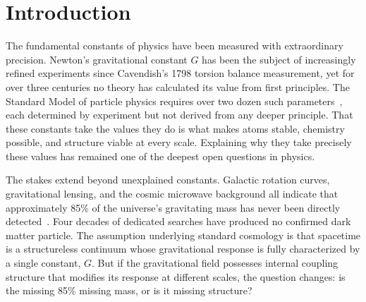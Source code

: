 \documentclass[aps,prd,preprint,superscriptaddress,showpacs,preprintnumbers,amsmath,amssymb,nofootinbib]{revtex4-2}
\begin{document}


\maketitle

\section{Introduction}
\label{sec:intro}

The fundamental constants of physics have been measured with extraordinary precision. Newton's gravitational constant $G$ has been the subject of increasingly refined experiments since Cavendish's 1798 torsion balance measurement, yet for over three centuries no theory has calculated its value from first principles. The Standard Model of particle physics requires over two dozen such parameters~\cite{pdg2024}, each determined by experiment but not derived from any deeper principle. That these constants take the values they do is what makes atoms stable, chemistry possible, and structure viable at every scale. Explaining why they take precisely these values has remained one of the deepest open questions in physics.

The stakes extend beyond unexplained constants. Galactic rotation curves, gravitational lensing, and the cosmic microwave background all indicate that approximately 85\% of the universe's gravitating mass has never been directly detected~\cite{pdg2024}. Four decades of dedicated searches have produced no confirmed dark matter particle. The assumption underlying standard cosmology is that spacetime is a structureless continuum whose gravitational response is fully characterized by a single constant, $G$. But if the gravitational field possesses internal coupling structure that modifies its response at different scales, the question changes: is the missing 85\% missing mass, or is it missing structure?
\end{document}
